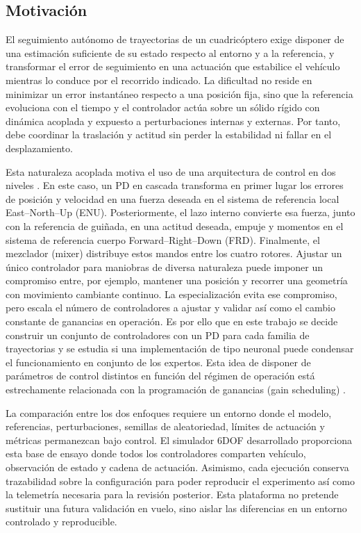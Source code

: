 \subsection{Motivación}
\label{subsec:motivacion-contexto}

El seguimiento autónomo de trayectorias de un cuadricóptero exige disponer de
una estimación suficiente de su estado respecto al entorno y a la referencia, y
transformar el error de seguimiento en una actuación que estabilice el vehículo
mientras lo conduce por el recorrido indicado. La dificultad no reside en
minimizar un error instantáneo respecto a una posición fija, sino que la referencia
evoluciona con el tiempo y el controlador actúa sobre un sólido rígido con dinámica
acoplada y expuesto a perturbaciones internas y externas. Por tanto, debe coordinar
la traslación y actitud sin perder la estabilidad ni fallar en el desplazamiento.

Esta naturaleza acoplada motiva el uso de una arquitectura de control en dos
niveles \cite{beard2012small,mellinger2011minimum,lee2010geometric}. En este
caso, un PD en cascada transforma en primer lugar los errores de posición y
velocidad en una fuerza deseada en el sistema de referencia local East--North--Up
(ENU). Posteriormente, el lazo interno convierte esa fuerza, junto con la referencia
de guiñada, en una actitud deseada, empuje y momentos en el sistema de referencia
cuerpo Forward--Right--Down (FRD). Finalmente, el mezclador (mixer) distribuye
estos mandos entre los cuatro rotores. Ajustar un único controlador para maniobras
de diversa naturaleza puede imponer un compromiso entre, por ejemplo, mantener una
posición y recorrer una geometría con movimiento cambiante continuo. La especialización
evita ese compromiso, pero escala el número de controladores a ajustar y validar
así como el cambio constante de ganancias en operación. Es por ello que en este
trabajo se decide construir un conjunto de controladores con un PD para cada 
familia de trayectorias y se estudia si una implementación de tipo neuronal puede
condensar el funcionamiento en conjunto de los expertos. Esta idea de disponer de 
parámetros de control distintos en función del régimen de operación está estrechamente
relacionada con la programación de ganancias (gain scheduling) \cite{leith2000survey}.

La comparación entre los dos enfoques requiere un entorno donde el modelo, referencias,
perturbaciones, semillas de aleatoriedad, límites de actuación y métricas permanezcan 
bajo control. El simulador 6DOF desarrollado proporciona esta base de ensayo donde
todos los controladores comparten vehículo, observación de estado y cadena de actuación. 
Asimismo, cada ejecución conserva trazabilidad sobre la configuración para poder reproducir
el experimento así como la telemetría necesaria para la revisión posterior. Esta plataforma 
no pretende sustituir una futura validación en vuelo, sino aislar las diferencias en un
entorno controlado y reproducible.

